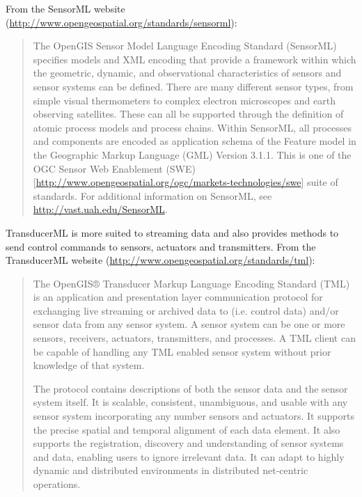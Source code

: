 From the SensorML website (\href{http://www.opengeospatial.org/standards/sensorml}{http://www.opengeospatial.org/standards/sensorml}):
\begin{quotation}
The OpenGIS Sensor Model Language Encoding Standard (SensorML) specifies models and XML encoding that provide a framework within which the geometric, dynamic, and observational characteristics of sensors and sensor systems can be defined. There are many different sensor types, from simple visual thermometers to complex electron microscopes and earth observing satellites. These can all be supported through the definition of atomic process models and process chains. Within SensorML, all processes and components are encoded as application schema of the Feature model in the Geographic Markup Language (GML) Version 3.1.1. This is one of the OGC Sensor Web Enablement (SWE) [\href{http://www.opengeospatial.org/ogc/markets-technologies/swe}{http://www.opengeospatial.org/ogc/markets-technologies/swe}] suite of standards. For additional information on SensorML, see \href{http://vast.uah.edu/SensorML}{http://vast.uah.edu/SensorML}.

\end{quotation}

TransducerML is more suited to streaming data and also provides methods to send control commands to sensors, actuators and transmitters.  From the TransducerML website (\href{http://www.opengeospatial.org/standards/tml}{http://www.opengeospatial.org/standards/tml}):
\begin{quotation}
 The OpenGIS® Transducer Markup Language Encoding Standard (TML) is an application and presentation layer communication protocol for exchanging live streaming or archived data to (i.e. control data) and/or sensor data from any sensor system. A sensor system can be one or more sensors, receivers, actuators, transmitters, and processes. A TML client can be capable of handling any TML enabled sensor system without prior knowledge of that system.

The protocol contains descriptions of both the sensor data and the sensor system itself. It is scalable, consistent, unambiguous, and usable with any sensor system incorporating any number sensors and actuators. It supports the precise spatial and temporal alignment of each data element. It also supports the registration, discovery and understanding of sensor systems and data, enabling users to ignore irrelevant data. It can adapt to highly dynamic and distributed environments in distributed net-centric operations.
\end{quotation}

